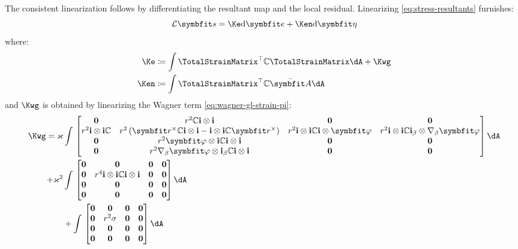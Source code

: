The consistent linearization follows by differentiating the resultant map and the local residual. Linearizing \eqref{eq:stress-resultants} furnishes:
\begin{equation}
    \mathcal{L}\bm{s} = \Ke \dd \bm{e} + \Ken \dd \bm{\eta}
\label{eq:Lins}
\end{equation}
where:
\begin{subequations}
\begin{align}
\Ke &\coloneq \int \TotalStrainMatrix^{\top}\mathbb{C}\TotalStrainMatrix \dA  + \Kwg \label{eq:Kee} \\
\Ken &\coloneq \int \TotalStrainMatrix^{\top}\mathbb{C}\EnhanShapes\dA \label{eq:Ken} \\
\end{align}
\end{subequations}
and \(\Kwg\) is obtained by linearizing the Wagner term \eqref{eq:wagner-gl-strain-pi}:
\begin{equation}
\begin{aligned}
\Kwg =
\Twist & \SectionIntegral{
\left[\begin{matrix}
\mathbf{0} & r^{2}  \mathbb{C} \FrameBasis \otimes \FrameBasis & \mathbf{0} & \mathbf{0} \\
r^{2}  \FrameBasis \otimes \FrameBasis \mathbb{C} 
& r^{2}  \left(\bm{r}^{\times} \mathbb{C} \FrameBasis \otimes \FrameBasis - \FrameBasis \otimes \FrameBasis \mathbb{C} \bm{r}^{\times}\right) & r^{2}  \FrameBasis \otimes \FrameBasis \mathbb{C} \FrameBasis\otimes \WarpAxialShapes & r^{2}  \FrameBasis \otimes \FrameBasis \mathbb{C} \FrameBasis_{\beta} \otimes \nabla_{\beta} \WarpAxialShapes\\
\mathbf{0} & r^{2}  \WarpAxialShapes \otimes \FrameBasis \mathbb{C} \FrameBasis \otimes \FrameBasis & \mathbf{0} & \mathbf{0} \\
\mathbf{0} & r^{2}  \nabla_{\beta} \WarpAxialShapes \otimes \FrameBasis_{\beta} \mathbb{C} \FrameBasis \otimes \FrameBasis & \mathbf{0} & \mathbf{0} 
\end{matrix}\right]} \\
+\Twist^2 & \SectionIntegral{\left[\begin{matrix}
\mathbf{0} & \mathbf{0} & \mathbf{0} & \mathbf{0} \\
\mathbf{0} & r^{4} \FrameBasis \otimes \FrameBasis \mathbb{C} \FrameBasis \otimes \FrameBasis & \mathbf{0} & \mathbf{0} \\
\mathbf{0} & \mathbf{0} & \mathbf{0} & \mathbf{0} \\
\mathbf{0} & \mathbf{0} & \mathbf{0} & \mathbf{0}
\end{matrix}\right]
} \\
&+\SectionIntegral{\left[\begin{matrix}
\mathbf{0} & \mathbf{0} & \mathbf{0} & \mathbf{0} \\
\mathbf{0} & r^2 \AxialStress & \mathbf{0} & \mathbf{0} \\
\mathbf{0} & \mathbf{0} & \mathbf{0} & \mathbf{0} \\
\mathbf{0} & \mathbf{0} & \mathbf{0} & \mathbf{0} 
\end{matrix}\right]
}
\end{aligned}
\label{eq:section-wagner-tangent}
\end{equation}
